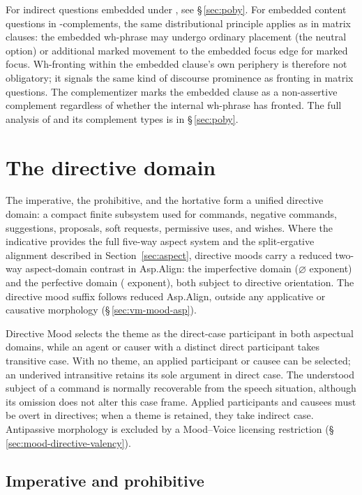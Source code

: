For indirect questions embedded under , see §\,\ref{sec:poby}. For
embedded content questions in -complements, the same distributional
principle applies as in matrix clauses: the embedded wh-phrase may undergo ordinary placement
(the neutral option) or additional marked movement to the embedded focus edge
for marked focus. Wh-fronting within the embedded clause's own periphery is
therefore not obligatory; it signals the same kind of discourse prominence as
fronting in matrix questions. The  complementizer marks the embedded
clause as a non-assertive complement regardless of whether the internal
wh-phrase has fronted. The full analysis of  and its complement types
is in §\,\ref{sec:poby}.


\section{The directive domain}\label{sec:mood-directive}

The imperative, the prohibitive, and the hortative form a unified directive
domain: a compact finite subsystem used for commands, negative commands,
suggestions, proposals, soft requests, permissive uses, and wishes. Where the
indicative provides the full five-way aspect system and the split-ergative
alignment described in Section~\ref{sec:aspect}, directive moods carry a reduced
two-way aspect-domain contrast in Asp.Align: the imperfective domain
($\varnothing$ exponent) and the perfective domain
( exponent), both subject to directive orientation. The directive mood suffix follows
reduced Asp.Align, outside any applicative or causative morphology
(§\,\ref{sec:vm-mood-asp}).

Directive Mood selects the theme as the direct-case participant in both
aspectual domains, while an agent or causer with a distinct direct participant
takes transitive case. With no theme, an applied participant or causee can be
selected; an underived intransitive retains its sole argument in direct case.
The understood subject of a command is normally recoverable from the speech
situation, although its omission does not alter this case frame. Applied
participants and causees must be overt in directives; when a theme is retained,
they take indirect case. Antipassive morphology is excluded by a Mood--Voice
licensing restriction (§\,\ref{sec:mood-directive-valency}).

\subsection{Imperative and prohibitive}\label{sec:mood-imp}

